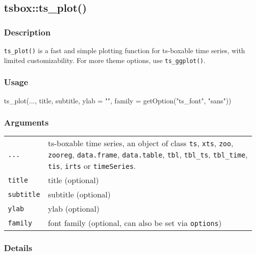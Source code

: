\documentclass[
  letterpaper,
  DIV=11,
  numbers=noendperiod]{scrreport}
\newenvironment{Shaded}{\begin{snugshade}}{\end{snugshade}}
\newcommand{\AttributeTok}[1]{\textcolor[rgb]{0.40,0.45,0.13}{#1}}
\newcommand{\FunctionTok}[1]{\textcolor[rgb]{0.28,0.35,0.67}{#1}}
\newcommand{\NormalTok}[1]{\textcolor[rgb]{0.00,0.23,0.31}{#1}}
\newcommand{\StringTok}[1]{\textcolor[rgb]{0.13,0.47,0.30}{#1}}
\begin{document}
\subsection{tsbox::ts\_plot()}\label{tsboxts_plot}

\subsubsection{Description}\label{description-61}

\texttt{ts\_plot()} is a fast and simple plotting function for
ts-boxable time series, with limited customizability. For more theme
options, use \texttt{ts\_ggplot()}.

\subsubsection{Usage}\label{usage-61}

\begin{Shaded}
\begin{Highlighting}[]
\FunctionTok{ts\_plot}\NormalTok{(..., title, subtitle, }\AttributeTok{ylab =} \StringTok{""}\NormalTok{, }\AttributeTok{family =} \FunctionTok{getOption}\NormalTok{(}\StringTok{"ts\_font"}\NormalTok{, }\StringTok{"sans"}\NormalTok{))}
\end{Highlighting}
\end{Shaded}

\subsubsection{Arguments}\label{arguments-61}

\begin{longtable}[]{@{}ll@{}}
\toprule\noalign{}
\endhead
\bottomrule\noalign{}
\endlastfoot
\texttt{...} & ts-boxable time series, an object of class \texttt{ts},
\texttt{xts}, \texttt{zoo}, \texttt{zooreg}, \texttt{data.frame},
\texttt{data.table}, \texttt{tbl}, \texttt{tbl\_ts}, \texttt{tbl\_time},
\texttt{tis}, \texttt{irts} or \texttt{timeSeries}. \\
\texttt{title} & title (optional) \\
\texttt{subtitle} & subtitle (optional) \\
\texttt{ylab} & ylab (optional) \\
\texttt{family} & font family (optional, can also be set via
\texttt{options}) \\
\end{longtable}

\subsubsection{Details}\label{details-19}
\end{document}
